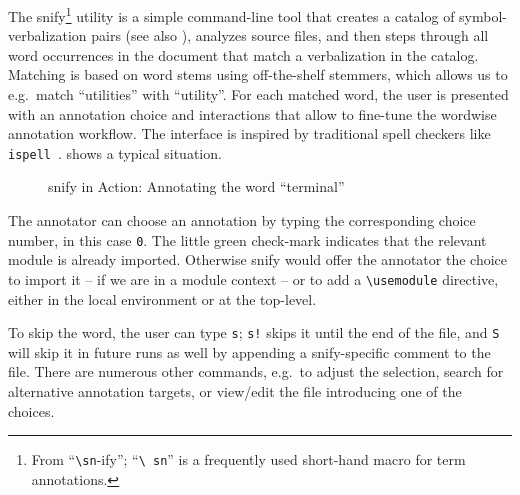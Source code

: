 \documentclass[runningheads]{llncs}
\newcommand\snify{\textsf{snify}\xspace}
\begin{document}
The \snify\footnote{ From ``\texttt{\textbackslash sn}-ify''; ``\texttt{\textbackslash
    sn}'' is a frequently used \sTeX short-hand macro for term annotations.}  utility
\cite{stextools:git} is a simple command-line tool that creates a catalog of
symbol-verbalization pairs (see also ), analyzes \sTeX source files, and then steps through all word
occurrences in the document that match a verbalization in the catalog.  Matching is based
on word stems using off-the-shelf stemmers, which allows us to e.g.\ match ``utilities''
with ``utility''.  For each matched word, the user is presented with an annotation choice
and interactions that allow to fine-tune the wordwise annotation workflow.  The interface
is inspired by traditional spell checkers like \lstinline|ispell|~\cite{ispellman}.   shows
a typical situation.

\begin{figure}[ht]
  \setlength{\fboxsep}{0pt}
  \caption{\snify in Action: Annotating the word ``terminal''}\label{fig:snify}
\end{figure}

The annotator can choose an annotation by typing the corresponding choice number,
in this case \lstinline|0|.
The little green check-mark indicates that the relevant module is already imported.
Otherwise \snify would offer the annotator the choice to import it -- if we are
in a module context -- or to add a \lstinline|\usemodule| directive, either in the
local environment or at the top-level.

To skip the word, the user can type \lstinline|s|;
\lstinline|s!| skips it until the end of the file, and \lstinline|S|
will skip it in future runs as well by appending a \snify-specific comment to the file.
There are numerous other commands, e.g.\ to adjust the selection,
search for alternative annotation targets,
or view/edit the file introducing one of the choices.
\end{document}
